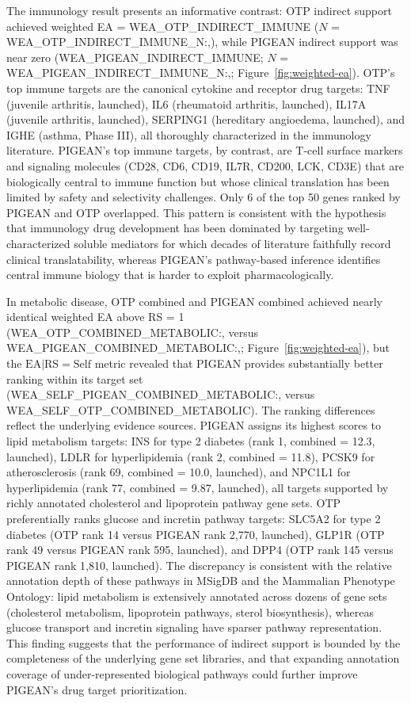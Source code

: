 The immunology result presents an informative contrast: OTP indirect support achieved weighted EA = {{WEA_OTP_INDIRECT_IMMUNE}} ($N$ = {{WEA_OTP_INDIRECT_IMMUNE_N:,}}), while PIGEAN indirect support was near zero ({{WEA_PIGEAN_INDIRECT_IMMUNE}}; $N$ = {{WEA_PIGEAN_INDIRECT_IMMUNE_N:,}}; Figure~\ref{fig:weighted-ea}). OTP's top immune targets are the canonical cytokine and receptor drug targets: TNF (juvenile arthritis, launched), IL6 (rheumatoid arthritis, launched), IL17A (juvenile arthritis, launched), SERPING1 (hereditary angioedema, launched), and IGHE (asthma, Phase III), all thoroughly characterized in the immunology literature. PIGEAN's top immune targets, by contrast, are T-cell surface markers and signaling molecules (CD28, CD6, CD19, IL7R, CD200, LCK, CD3E) that are biologically central to immune function but whose clinical translation has been limited by safety and selectivity challenges. Only 6 of the top 50 genes ranked by PIGEAN and OTP overlapped. This pattern is consistent with the hypothesis that immunology drug development has been dominated by targeting well-characterized soluble mediators for which decades of literature faithfully record clinical translatability, whereas PIGEAN's pathway-based inference identifies central immune biology that is harder to exploit pharmacologically.

In metabolic disease, OTP combined and PIGEAN combined achieved nearly identical weighted EA above RS = 1 ({{WEA_OTP_COMBINED_METABOLIC:,}} versus {{WEA_PIGEAN_COMBINED_METABOLIC:,}}; Figure~\ref{fig:weighted-ea}), but the $\text{EA}|\text{RS}{=}\text{Self}$ metric revealed that PIGEAN provides substantially better ranking within its target set ({{WEA_SELF_PIGEAN_COMBINED_METABOLIC:,}} versus {{WEA_SELF_OTP_COMBINED_METABOLIC}}). The ranking differences reflect the underlying evidence sources. PIGEAN assigns its highest scores to lipid metabolism targets: INS for type 2 diabetes (rank 1, combined = 12.3, launched), LDLR for hyperlipidemia (rank 2, combined = 11.8), PCSK9 for atherosclerosis (rank 69, combined = 10.0, launched), and NPC1L1 for hyperlipidemia (rank 77, combined = 9.87, launched), all targets supported by richly annotated cholesterol and lipoprotein pathway gene sets. OTP preferentially ranks glucose and incretin pathway targets: SLC5A2 for type 2 diabetes (OTP rank 14 versus PIGEAN rank 2,770, launched), GLP1R (OTP rank 49 versus PIGEAN rank 595, launched), and DPP4 (OTP rank 145 versus PIGEAN rank 1,810, launched). The discrepancy is consistent with the relative annotation depth of these pathways in MSigDB and the Mammalian Phenotype Ontology: lipid metabolism is extensively annotated across dozens of gene sets (cholesterol metabolism, lipoprotein pathways, sterol biosynthesis), whereas glucose transport and incretin signaling have sparser pathway representation. This finding suggests that the performance of indirect support is bounded by the completeness of the underlying gene set libraries, and that expanding annotation coverage of under-represented biological pathways could further improve PIGEAN's drug target prioritization.
